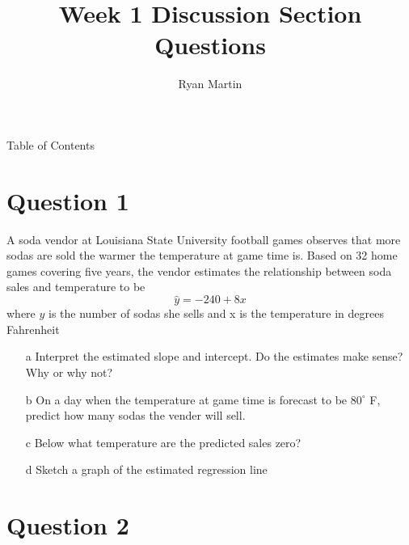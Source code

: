 \documentclass[xcolor={dvipsnames}]{beamer}
\title{ Week 1 Discussion Section Questions }
\author{Ryan Martin}
\begin{document}
	\maketitle


	\begin{frame}{Table of Contents}
		\tableofcontents
	\end{frame}

	\section{Question 1}
	
\begin{frame}{2.6}

A soda vendor at Louisiana State University football games observes that more sodas are sold the warmer the temperature at game time is. Based on 32 home games covering five years, the vendor estimates the relationship between soda sales and temperature to be $$\hat{y} = - 240 + 8x$$ where $y$ is the number of sodas she sells and x is the temperature in degrees Fahrenheit

	\begin{itemize}[<+->]

		\item[a] Interpret the estimated slope and intercept. Do the estimates make sense? Why or why not?

		\item[b] On a day when the temperature at game time is forecast to be $80^\circ$ F, predict how many sodas the vender will sell.

		\item[c] Below what temperature are the predicted sales zero?

		\item[d] Sketch a graph of the estimated regression line
	\end{itemize}

\end{frame}



\section{Question 2}

\AtBeginSection
\end{document}
